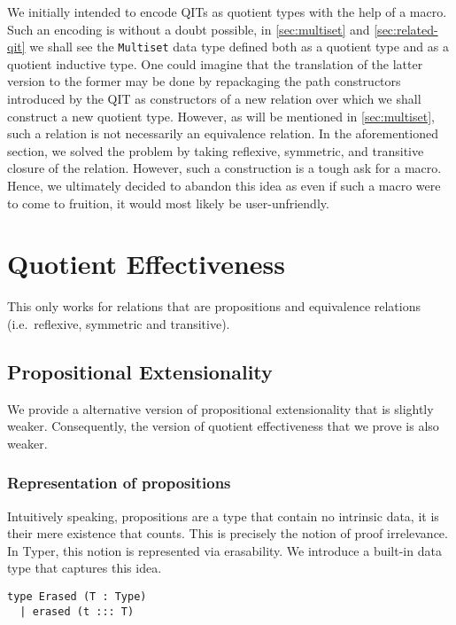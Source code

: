 \documentclass[12pt,twoside,maitrise]{dms}
\theoremstyle{definition}
\numberwithin{equation}{section}
\numberwithin{table}{chapter}
\numberwithin{figure}{chapter}
\newcommand\id[1] {\texttt{#1}}
\begin{document}
We initially intended to encode QITs as quotient types with the help of a macro.
Such an encoding is without a doubt possible, in \autoref{sec:multiset} and
\autoref{sec:related-qit} we shall see the \id{Multiset} data type defined both
as a quotient type and as a quotient inductive type. One could imagine that the
translation of the latter version to the former may be done by repackaging the
path constructors introduced by the QIT as constructors of a new relation over
which we shall construct a new quotient type. However, as will be mentioned in
\autoref{sec:multiset}, such a relation is not necessarily an equivalence
relation. In the aforementioned section, we solved the problem by taking
reflexive, symmetric, and transitive closure of the relation. However, such a
construction is a tough ask for a macro. Hence, we ultimately decided to abandon
this idea as even if such a macro were to come to fruition, it would most likely
be user-unfriendly.

\chapter{Quotient Effectiveness}\label{ch:quotient-effectiveness}

This only works for relations that are propositions and equivalence relations
(i.e.\ reflexive, symmetric and transitive).

\section{Propositional Extensionality}
We provide a alternative version of propositional extensionality that is
slightly weaker. Consequently, the version of quotient effectiveness that we
prove is also weaker.

\subsection*{Representation of propositions}\label{subsec:mere-propositions}

Intuitively speaking, propositions are a type that contain no intrinsic data, it
is their mere existence that counts. This is precisely the notion of proof
irrelevance. In Typer, this notion is represented via erasability. We introduce
a built-in data type that captures this idea.

\begin{verbatim}
type Erased (T : Type)
  | erased (t ::: T)
\end{verbatim}
\end{document}
